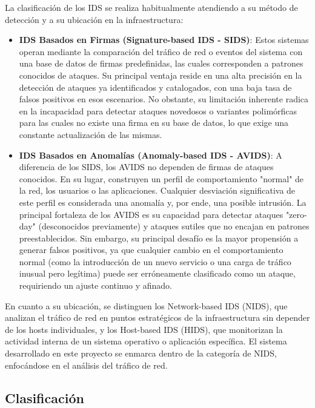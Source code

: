 La clasificación de los IDS se realiza habitualmente atendiendo a su método de detección y a su ubicación en la infraestructura:
\begin{itemize}
    
    \item\textbf{IDS Basados en Firmas (Signature-based IDS - SIDS)}: Estos sistemas operan mediante la comparación del tráfico de red o eventos del sistema con una base de datos de firmas predefinidas, las cuales corresponden a patrones conocidos de ataques. Su principal ventaja reside en una alta precisión en la detección de ataques ya identificados y catalogados, con una baja tasa de falsos positivos en esos escenarios. No obstante, su limitación inherente radica en la incapacidad para detectar ataques novedosos o variantes polimórficas para las cuales no existe una firma en su base de datos, lo que exige una constante actualización de las mismas.
    
    \item\textbf{IDS Basados en Anomalías (Anomaly-based IDS - AVIDS)}: A diferencia de los SIDS, los AVIDS no dependen de firmas de ataques conocidos. En su lugar, construyen un perfil de comportamiento "normal" de la red, los usuarios o las aplicaciones. Cualquier desviación significativa de este perfil es considerada una anomalía y, por ende, una posible intrusión. La principal fortaleza de los AVIDS es su capacidad para detectar ataques "zero-day" (desconocidos previamente) y ataques sutiles que no encajan en patrones preestablecidos. Sin embargo, su principal desafío es la mayor propensión a generar falsos positivos, ya que cualquier cambio en el comportamiento normal (como la introducción de un nuevo servicio o una carga de tráfico inusual pero legítima) puede ser erróneamente clasificado como un ataque, requiriendo un ajuste continuo y afinado.
    
\end{itemize}

En cuanto a su ubicación, se distinguen los Network-based IDS (NIDS), que analizan el tráfico de red en puntos estratégicos de la infraestructura sin depender de los hosts individuales, y los Host-based IDS (HIDS), que monitorizan la actividad interna de un sistema operativo o aplicación específica. El sistema desarrollado en este proyecto se enmarca dentro de la categoría de NIDS, enfocándose en el análisis del tráfico de red.

\subsection{Clasificación}

